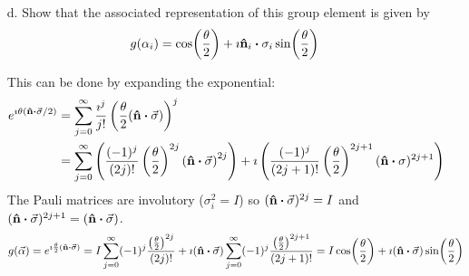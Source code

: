\documentclass[a4paper,twoside]{article}
\begin{document}
\begin{itemize}
    \item[d.] Show that the associated representation of this group element is given by
        \begin{equation}
            g(\alpha_i) = \cos(\frac{\theta}{2}) + \imath\vu{ n}_i \vdot \sigma_i\sin(\frac{\theta}{2})
        \end{equation}
        \begin{problem}
            This can be done by expanding the exponential:
            \begin{align}
                e^{\imath \theta (\vu{n} \vdot \va{\sigma}/2)} &= \sum_{j=0}^{\infty} \frac{\imath^j}{j!} \left( \frac{\theta}{2} (\vu{n} \vdot \va{\sigma}) \right)^j \\
                &= \sum_{j=0}^{\infty} \left( \frac{(-1)^j}{(2j)!} \left( \frac{\theta}{2} \right)^{2j} \left(\vu{ n} \vdot \va{\sigma} \right)^{2j} \right) + \imath \left( \frac{(-1)^j}{(2j + 1)!} \left( \frac{\theta}{2} \right)^{2j+1} (\vu{n} \vdot \sigma)^{2j + 1} \right)
            \end{align}
            The Pauli matrices are involutory ($ \sigma_i^2 = I $) so $ (\vu{n} \vdot \va{\sigma})^{2j} = I $ and $ (\vu{n} \vdot \va{\sigma})^{2j+1} = (\vu{n} \vdot \va{\sigma}) $.
            \begin{equation}
                g(\va{\alpha}) = e^{\imath \frac{\theta}{2} (\vu{n} \vdot \va{\sigma})} = I \sum_{j=0}^{\infty} (-1)^j\frac{\left( \frac{\theta}{2} \right)^{2j}}{(2j)!} + \imath (\vu{n} \vdot \va{\sigma}) \sum_{j=0}^{\infty} (-1)^j \frac{\left( \frac{\theta}{2} \right)^{2j+1}}{(2j+1)!} = I \cos(\frac{\theta}{2}) + \imath (\vu{n} \vdot \va{\sigma}) \sin(\frac{\theta}{2})
            \end{equation}
        \end{problem}


\end{itemize}
\end{document}
